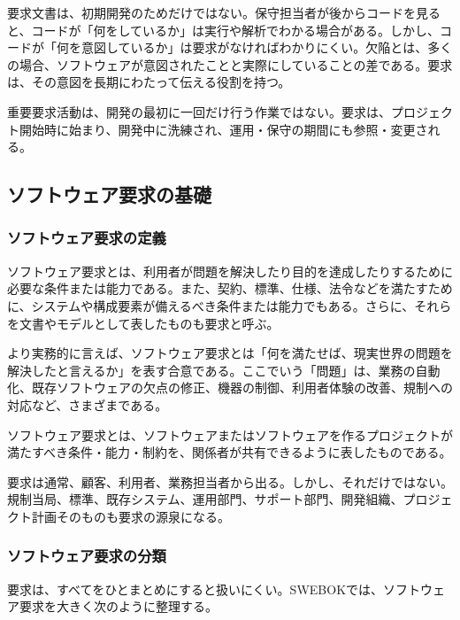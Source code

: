 \documentclass[a4paper,11pt]{ltjsarticle}
\numberwithin{figure}{section}
\numberwithin{table}{section}
\newcounter{definition}
\newcommand{\MiniBox}[2]{\par\smallskip\begin{statementbox}{#1}#2\end{statementbox}\par\smallskip}
\begin{document}
要求文書は、初期開発のためだけではない。保守担当者が後からコードを見ると、コードが「何をしているか」は実行や解析でわかる場合がある。しかし、コードが「何を意図しているか」は要求がなければわかりにくい。欠陥とは、多くの場合、ソフトウェアが意図されたことと実際にしていることの差である。要求は、その意図を長期にわたって伝える役割を持つ。

\MiniBox{重要}{要求活動は、開発の最初に一回だけ行う作業ではない。要求は、プロジェクト開始時に始まり、開発中に洗練され、運用・保守の期間にも参照・変更される。}

\subsection{ソフトウェア要求の基礎}

\subsubsection{ソフトウェア要求の定義}

ソフトウェア要求とは、利用者が問題を解決したり目的を達成したりするために必要な条件または能力である。また、契約、標準、仕様、法令などを満たすために、システムや構成要素が備えるべき条件または能力でもある。さらに、それらを文書やモデルとして表したものも要求と呼ぶ。

より実務的に言えば、ソフトウェア要求とは「何を満たせば、現実世界の問題を解決したと言えるか」を表す合意である。ここでいう「問題」は、業務の自動化、既存ソフトウェアの欠点の修正、機器の制御、利用者体験の改善、規制への対応など、さまざまである。

\begin{definitionbox}ソフトウェア要求とは、ソフトウェアまたはソフトウェアを作るプロジェクトが満たすべき条件・能力・制約を、関係者が共有できるように表したものである。\end{definitionbox}

要求は通常、顧客、利用者、業務担当者から出る。しかし、それだけではない。規制当局、標準、既存システム、運用部門、サポート部門、開発組織、プロジェクト計画そのものも要求の源泉になる。

\subsubsection{ソフトウェア要求の分類}

要求は、すべてをひとまとめにすると扱いにくい。SWEBOKでは、ソフトウェア要求を大きく次のように整理する。
\end{document}
